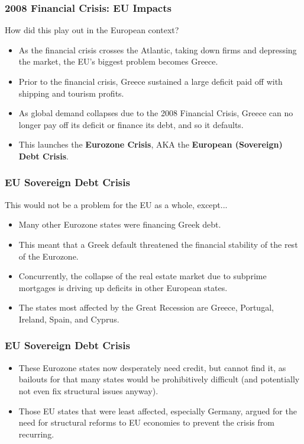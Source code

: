 \documentclass{beamer}
\begin{document}
\begin{frame} 
	\frametitle{\LARGE{2008 Financial Crisis: EU Impacts}}
	How did this play out in the European context? \pause
	\begin{itemize}
		\item As the financial crisis crosses the Atlantic, taking down firms and depressing the market, the EU's biggest problem becomes Greece. \pause
		\item Prior to the financial crisis, Greece sustained a large deficit paid off with shipping and tourism profits. \pause
		\item As global demand collapses due to the 2008 Financial Crisis, Greece can no longer pay off its deficit or finance its debt, and so it defaults.	\pause
		\item This launches the \textbf{Eurozone Crisis}, AKA the \textbf{European (Sovereign) Debt Crisis}.
	\end{itemize}
\end{frame}

\begin{frame} 
	\frametitle{\LARGE{EU Sovereign Debt Crisis}}
	This would not be a problem for the EU as a whole, except...
	\begin{itemize}
		\item Many other Eurozone states were financing Greek debt.
		\item This meant that a Greek default threatened the financial stability of the rest of the Eurozone. \pause
		\item Concurrently, the collapse of the real estate market due to subprime mortgages is driving up deficits in other European states. \pause
		\item The states most affected by the Great Recession are Greece, Portugal, Ireland, Spain, and Cyprus. 
	\end{itemize}
\end{frame}

\begin{frame} 
	\frametitle{\LARGE{EU Sovereign Debt Crisis}}
	
	\begin{itemize}
		\item These Eurozone states now desperately need credit, but cannot find it, as bailouts for that many states would be prohibitively difficult (and potentially not even fix structural issues anyway).\pause
		\item Those EU states that were least affected, especially Germany, argued for the need for structural reforms to EU economies to prevent the crisis from recurring.
	\end{itemize}
\end{frame}
\end{document}
